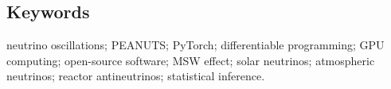 \subsection*{Keywords}
neutrino oscillations; PEANUTS; PyTorch; differentiable programming; GPU computing; open-source software; MSW effect; solar neutrinos; atmospheric neutrinos; reactor antineutrinos; statistical inference.
